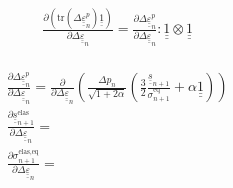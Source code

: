 \documentclass[12pt]{article}
\newcommand\ul[1]{\underline{#1}}
\newcommand\uus{\ul{\ul{s}}}
\newcommand\uuUnit{\ul{\ul{1}}}
\newcommand\uueps{\ul{\ul{\varepsilon}}}
\newcommand\Deltaepsp{\Delta \uueps_{n}^p}
\newcommand\Deltaeps{\Delta \uueps_{n}}
\newcommand\sigmaeqn{\sigma_{n+1}^\text{eq}}
\newcommand\sigmaeqnelas{\sigma_{n+1}^\text{elas,eq}}
\newcommand\uusn{\uus_{n+1}}
\newcommand\uusnelas{\uus_{n+1}^\text{elas}}
\newcommand\mtr{\mathrm{tr}}
\begin{document}
\begin{align}
    & \frac{\partial (\mtr (\Deltaepsp) \uuUnit)}{\partial \Deltaeps} = \frac{\partial \Deltaepsp}{\partial \Deltaeps} : \uuUnit \otimes  \uuUnit \\
\end{align}

\begin{align}
    & \frac{\partial \Deltaepsp}{\partial \Deltaeps} = \frac{\partial}{\partial \Deltaeps} \left( \frac{\Delta p_n}{\sqrt{1 + 2\alpha}} \left( \frac{3}{2} \frac{\uusn}{\sigmaeqn} + \alpha \uuUnit \right)  \right) \\
    & \frac{\partial \uusnelas{}}{\partial \Deltaeps} = \\
    & \frac{\partial \sigmaeqnelas{}}{\partial \Deltaeps} = 
\end{align}
\end{document}
